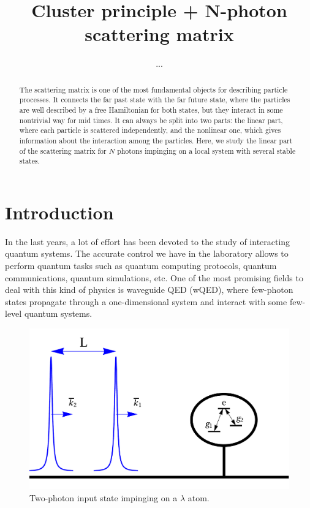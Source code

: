 \documentclass[aps,pra,reprint,amsmath,amssymb]{revtex4-1}
\begin{document}
\title{Cluster principle + N-photon scattering matrix}

\author{...}


\begin{abstract}
The scattering matrix is one of the most fundamental objects for describing particle processes. It connects the far past state with the far future state, where the particles are well described by a free Hamiltonian for both states, but they interact in some nontrivial way for mid times. It can always be split into two parts: the linear part, where each particle is scattered independently, and the nonlinear one, which gives information about the interaction among the particles. Here, we study the linear part of the scattering matrix for $N$ photons impinging on a local system with several stable states. 
\end{abstract}



\maketitle


\section{Introduction}

In the last years, a lot of effort has been devoted to the study of interacting quantum systems. The accurate control we have in the laboratory allows to perform quantum tasks such as quantum computing protocols, quantum communications, quantum simulations, etc. One of the most promising fields to deal with this kind of physics is waveguide QED (wQED), where few-photon states propagate through a one-dimensional system and interact with some few-level quantum systems. \cite{fan10,Xu2015,Xu2016,Sanchez-Burillo2015,Sanchez-Burillo2016}

\begin{figure}
\includegraphics[scale=0.25]{input.pdf}
\caption{Two-photon input state impinging on a $\lambda$ atom.}
\end{figure}
\end{document}
